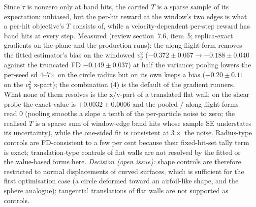 \documentclass[11pt,a4paper]{article}
\numberwithin{equation}{section}
\begin{document}
Since $\tau$ is nonzero only at band hits, the carried $T$ is a sparse sample of its
expectation: unbiased, but the per-hit reward at the window's two edges is what a per-hit
objective's $T$ consists of, while a velocity-dependent per-step reward has band hits at
every step.  Measured (review section~7.6, item~5; replica-exact gradients on the plane
and the production runs): the along-flight form removes the fitted estimator's bias on
the windowed $v_y^2$ ($-0.372 \pm 0.067 \to -0.188 \pm 0.040$ against the truncated FD
$-0.149 \pm 0.037$) at half the variance; pooling lowers the per-seed sd 4--7$\times$ on
the circle radius but on its own keeps a bias ($-0.20 \pm 0.11$ on the $v_y^2$ x-part);
the combination (4) is the default of the gradient runners.  What none of them resolves
is the x/v-part of a translated flat wall: on the shear probe the exact value is
$+0.0032 \pm 0.0006$ and the pooled / along-flight forms read $0$ (pooling smooths a
slope a tenth of the per-particle noise to zero; the realised $T$ is a sparse sum of
window-edge band hits whose sample SE understates its uncertainty), while the one-sided
fit is consistent at $3\times$ the noise.  Radius-type controls are FD-consistent to a
few per cent because their fixed-hit-set tally term is exact; translation-type
controls of flat walls are not resolved by the fitted or the value-based forms here.
\emph{Decision (open issue):} shape controls are therefore restricted to normal
displacements of curved surfaces, which is sufficient for the first optimisation case
(a circle deformed toward an airfoil-like shape, and the sphere analogue); tangential
translations of flat walls are not supported as controls.
\end{document}
